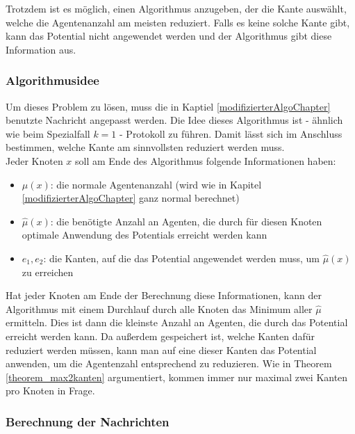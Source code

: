 Trotzdem ist es möglich, einen Algorithmus anzugeben, der die Kante auswählt, welche die Agentenanzahl am meisten reduziert. Falls es keine solche Kante gibt, kann das Potential nicht angewendet werden und der Algorithmus gibt diese Information aus.


\subsubsection{Algorithmusidee}

	Um dieses Problem zu lösen, muss die in Kaptiel \ref{modifizierterAlgoChapter} benutzte Nachricht angepasst werden. Die Idee dieses Algorithmus ist - ähnlich wie beim Spezialfall $k = 1$ -  Protokoll zu führen. Damit lässt sich im Anschluss bestimmen, welche Kante am sinnvollsten reduziert werden muss.\\
	Jeder Knoten $x$ soll am Ende des Algorithmus folgende Informationen haben:
	\begin{itemize}
		\item $\mu(x)$: die normale Agentenanzahl (wird wie in Kapitel \ref{modifizierterAlgoChapter} ganz normal berechnet)
		\item $\hat{\mu}(x)$: die benötigte Anzahl an Agenten, die durch für diesen Knoten optimale Anwendung des Potentials erreicht werden kann
		\item $e_{1}, e_{2}$: die Kanten, auf die das Potential angewendet werden muss, um $\hat{\mu}(x)$ zu erreichen
	\end{itemize}
	Hat jeder Knoten am Ende der Berechnung diese Informationen, kann der Algorithmus mit einem Durchlauf durch alle Knoten das Minimum aller $\hat{\mu}$ ermitteln. Dies ist dann die kleinste Anzahl an Agenten, die durch das Potential erreicht werden kann. Da außerdem gespeichert ist, welche Kanten dafür reduziert werden müssen, kann man auf eine dieser Kanten das Potential anwenden, um die Agentenzahl entsprechend zu reduzieren. Wie in Theorem \ref{theorem_max2kanten} argumentiert, kommen immer nur maximal zwei Kanten pro Knoten in Frage.
	
	
	\subsubsection{Berechnung der Nachrichten}
	
